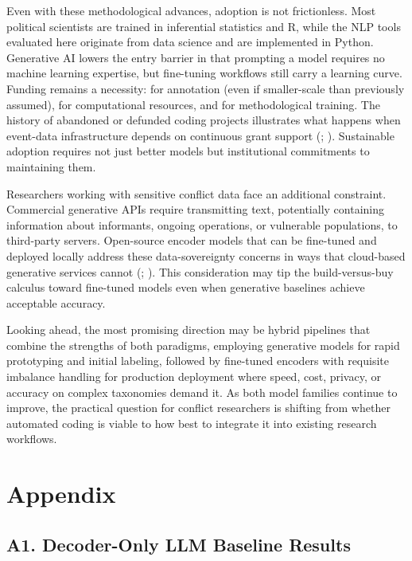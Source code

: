 \documentclass[
  11pt,
]{article}
\begin{document}
Even with these methodological advances, adoption is not frictionless.
Most political scientists are trained in inferential statistics and R,
while the NLP tools evaluated here originate from data science and are
implemented in Python. Generative AI lowers the entry barrier in that
prompting a model requires no machine learning expertise, but
fine-tuning workflows still carry a learning curve. Funding remains a
necessity: for annotation (even if smaller-scale than previously
assumed), for computational resources, and for methodological training.
The history of abandoned or defunded coding projects illustrates what
happens when event-data infrastructure depends on continuous grant
support (;
). Sustainable
adoption requires not just better models but institutional commitments
to maintaining them.

Researchers working with sensitive conflict data face an additional
constraint. Commercial generative APIs require transmitting text,
potentially containing information about informants, ongoing operations,
or vulnerable populations, to third-party servers. Open-source encoder
models that can be fine-tuned and deployed locally address these
data-sovereignty concerns in ways that cloud-based generative services
cannot (;
). This consideration
may tip the build-versus-buy calculus toward fine-tuned models even when
generative baselines achieve acceptable accuracy.

Looking ahead, the most promising direction may be hybrid pipelines that
combine the strengths of both paradigms, employing generative models for
rapid prototyping and initial labeling, followed by fine-tuned encoders
with requisite imbalance handling for production deployment where speed,
cost, privacy, or accuracy on complex taxonomies demand it. As both
model families continue to improve, the practical question for conflict
researchers is shifting from whether automated coding is viable to how
best to integrate it into existing research workflows.

\newpage

\section{Appendix}\label{appendix}

\subsection{A1. Decoder-Only LLM Baseline
Results}\label{sec-llm-results}
\end{document}
